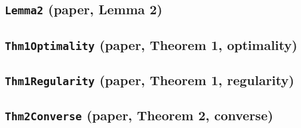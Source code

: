 \documentclass[11pt]{amsart}
\theoremstyle{definition}
\begin{document}
\subsection{\texorpdfstring{\texttt{Lemma2} (paper, Lemma 2)}{Lemma2}}\label{node:Lemma2}


\subsection{\texorpdfstring{\texttt{Thm1Optimality} (paper, Theorem 1, optimality)}{Thm1Optimality}}\label{node:Thm1Optimality}


\subsection{\texorpdfstring{\texttt{Thm1Regularity} (paper, Theorem 1, regularity)}{Thm1Regularity}}\label{node:Thm1Regularity}


\subsection{\texorpdfstring{\texttt{Thm2Converse} (paper, Theorem 2, converse)}{Thm2Converse}}\label{node:Thm2Converse}

\end{document}
